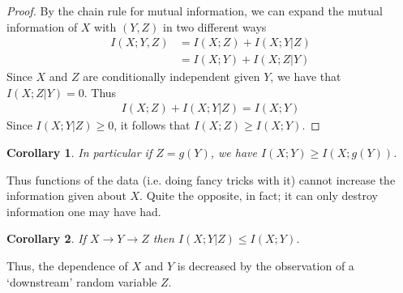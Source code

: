 \documentclass{article}
\theoremstyle{definition}
\theoremstyle{plain}
\newtheorem{corollary}{Corollary}[section]
\begin{document}
\begin{proof}
	By the chain rule for mutual information, we can expand the mutual information of $X$ with $(Y,Z)$ in two different ways
	\begin{align}
		I(X;Y,Z) &= I(X;Z)+I(X;Y|Z) \\
				 &= I(X;Y)+I(X;Z|Y)
	\end{align}	
Since $X$ and $Z$ are conditionally independent given $Y$, we have that $I(X;Z|Y) = 0$. Thus
\begin{align}
	I(X;Z) + I(X;Y|Z) = I(X;Y)
\end{align}
Since $I(X;Y|Z) \geq 0$, it follows that $I(X;Z) \geq I(X;Y)$. 
\end{proof}
\begin{corollary}
	In particular if $Z = g(Y)$, we have $I(X;Y) \geq I(X;g(Y))$. 
\end{corollary}
Thus functions of the data (i.e. doing fancy tricks with it) cannot increase the information given about $X$. Quite the opposite, in fact; it can only destroy information one may have had. 
\begin{corollary}
	If $X \to Y \to Z$ then $I(X;Y|Z) \leq I(X;Y)$.
\end{corollary}
Thus, the dependence of $X$ and $Y$ is decreased by the observation of a `downstream' random variable $Z$. 
\end{document}
